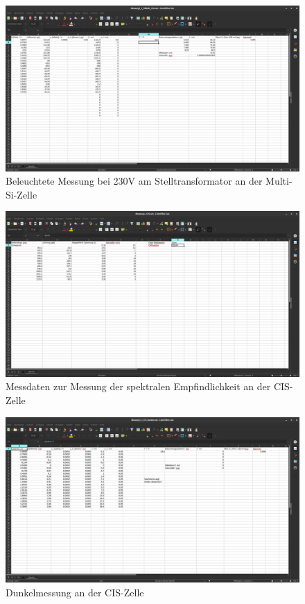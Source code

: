 \begin{figure}[h]
    \captionsetup{justification=centering,margin=2cm}
    \centering
    \includegraphics[angle = 90, width = 12cm]{Bilder/Daten/MessungMultiSi230.png}
    \caption{Beleuchtete Messung bei 230V am Stelltransformator an der Multi-Si-Zelle}
\end{figure}






\begin{figure}[h]
    \captionsetup{justification=centering,margin=2cm}
    \centering
    \includegraphics[angle = 90, width = 12cm]{Bilder/Daten/MessunngCIS.png}
    \caption{Messdaten zur Messung der spektralen Empfindlichkeit an der CIS-Zelle}
\end{figure}


\begin{figure}[h]
    \captionsetup{justification=centering,margin=2cm}
    \centering
    \includegraphics[angle = 90, width = 12cm]{Bilder/Daten/MessunngCISDunkel.png}
    \caption{Dunkelmessung an der CIS-Zelle}
\end{figure}

